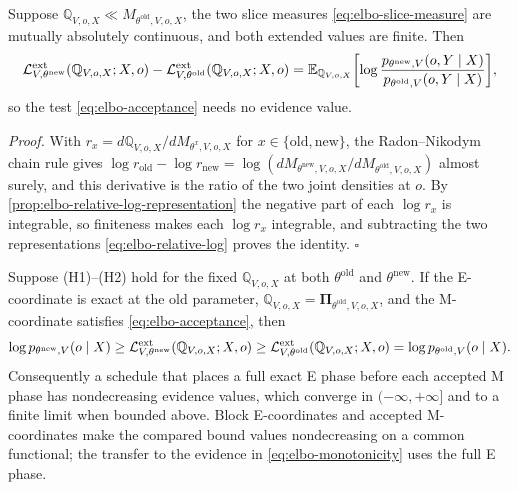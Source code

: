 Suppose $\mathbb Q_{V,o,X}\ll M_{\theta^{\mathrm{old}},V,o,X}$, the two slice
measures \eqref{eq:elbo-slice-measure} are mutually absolutely continuous, and
both extended values are finite. Then
\begin{equation}
\mathcal L^{\mathrm{ext}}_{V,\theta^{\mathrm{new}}}(\mathbb Q_{V,o,X};X,o)
-\mathcal L^{\mathrm{ext}}_{V,\theta^{\mathrm{old}}}(\mathbb Q_{V,o,X};X,o)
=\mathbb E_{\mathbb Q_{V,o,X}}\biggl[\log\frac{p_{\theta^{\mathrm{new}},V}(o,Y\mid X)}{p_{\theta^{\mathrm{old}},V}(o,Y\mid X)}\biggr],
\label{eq:elbo-acceptance-evidence-free}
\end{equation}
so the test \eqref{eq:elbo-acceptance} needs no evidence value.

\noindent\emph{Proof.}
With $r_x=d\mathbb Q_{V,o,X}/dM_{\theta^x,V,o,X}$ for
$x\in\{\mathrm{old},\mathrm{new}\}$, the Radon--Nikodym chain rule gives
$\log r_{\mathrm{old}}-\log r_{\mathrm{new}}
=\log(dM_{\theta^{\mathrm{new}},V,o,X}/dM_{\theta^{\mathrm{old}},V,o,X})$ almost
surely, and this derivative is the ratio of the two joint densities at $o$. By
\cref{prop:elbo-relative-log-representation} the negative part of each
$\log r_x$ is integrable, so finiteness makes each $\log r_x$ integrable, and
subtracting the two representations \eqref{eq:elbo-relative-log} proves the
identity. \hfill$\square$

Suppose (H1)--(H2) hold for the fixed $\mathbb Q_{V,o,X}$ at both
$\theta^{\mathrm{old}}$ and $\theta^{\mathrm{new}}$. If the E-coordinate is exact
at the old parameter, $\mathbb Q_{V,o,X}=\boldsymbol\Pi_{\theta^{\mathrm{old}},V,o,X}$,
and the M-coordinate satisfies \eqref{eq:elbo-acceptance}, then
\begin{equation}
\log p_{\theta^{\mathrm{new}},V}(o\mid X)
\geq\mathcal L^{\mathrm{ext}}_{V,\theta^{\mathrm{new}}}(\mathbb Q_{V,o,X};X,o)
\geq\mathcal L^{\mathrm{ext}}_{V,\theta^{\mathrm{old}}}(\mathbb Q_{V,o,X};X,o)
=\log p_{\theta^{\mathrm{old}},V}(o\mid X).
\label{eq:elbo-monotonicity}
\end{equation}
Consequently a schedule that places a full exact E phase before each accepted
M phase has nondecreasing evidence values, which converge in
$(-\infty,+\infty]$ and to a finite limit when bounded above. Block
E-coordinates and accepted M-coordinates make the compared bound values
nondecreasing on a common functional; the transfer to the evidence in
\eqref{eq:elbo-monotonicity} uses the full E phase. 

